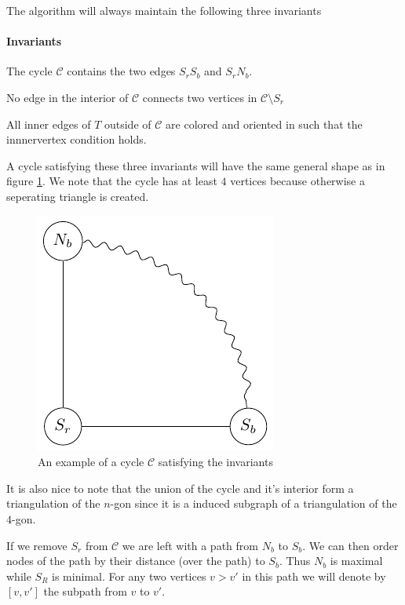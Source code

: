 \documentclass[a4paper]{article}
\theoremstyle{definition}
\newcommand{\scr}[1]{\mathcal{#1}}
\newcommand{\C}{\scr C}
\newenvironment{invariants}{%
  \refstepcounter{thrm}%
  \paragraph{Invariants~\theprop}%
  \renewcommand*{\theenumi}{\theprop\,(I\arabic{enumi})}%
  \renewcommand*{\labelenumi}{(I\arabic{enumi})}%
  \enumerate
}{%
  \endenumerate
}
\begin{document}
The algorithm will always maintain the following three invariants

\begin{invariants}
  \itemsep=-4pt

\item \label{i:1} The cycle $\C$ contains the two edges $S_rS_b$ and $S_rN_b$.
\item \label{i:2}No edge in the interior of $\C$ connects two vertices in $\C\setminus{S_r}$
\item \label{i:last} All inner edges of $T$ outside of $\C$ are colored and oriented in such that the innnervertex condition holds. %
\end{invariants}

A cycle satisfying these three invariants will have the same general shape as in figure \ref{fig:invCycle}. We note that the cycle has at least $4$ vertices because otherwise a seperating triangle is created. 

\begin{figure}[h!]
\centering
\includegraphics{img/algo/invCycle}

\caption{An example of a cycle $\C$ satisfying the invariants 
    \label{fig:invCycle}}
\end{figure}

It is also nice to note that the union of the cycle and it's interior form a triangulation of the $n$-gon since it is a induced subgraph of a triangulation of the $4$-gon.

If we remove $S_r$ from $\C$ we are left with a path from $N_b$ to $S_b$. We can then order nodes of the path by their distance (over the path)  to $S_b$. Thus $N_b$ is maximal while $S_R$ is minimal. For any two vertices $v > v'$ in this path we will denote by $[v, v']$ the subpath from $v$ to $v'$.
\end{document}
